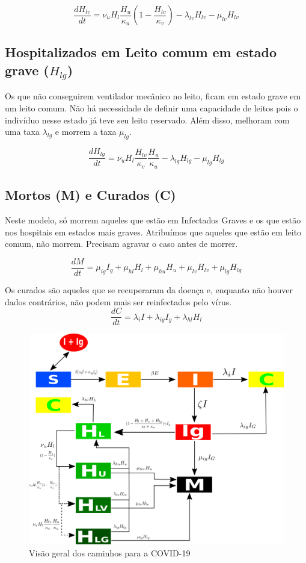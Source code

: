 \documentclass[12pt,letterpaper]{article}
\begin{document}
\begin{equation}
	\frac{dH_{lv}}{dt}=\nu_u H_l\frac{H_u}{\kappa_{u}}(1-\frac{H_{lv}}{\kappa_{v}})  - \lambda_{lv}H_{lv}-\mu_{lv}H_{lv}
\end{equation}
\subsection{Hospitalizados em Leito comum em estado grave ($H_{lg}$)}
Os que não conseguirem ventilador mecânico no leito, ficam em estado grave em um leito comum. Não há necessidade de definir uma capacidade de leitos pois o indivíduo nesse estado já teve seu leito reservado. Além disso, melhoram com uma taxa $\lambda_{lg}$ e morrem a taxa $\mu_{lg}$.

\begin{equation}
	\frac{dH_{lg}}{dt}=\nu_u H_l\frac{H_{lv}}{\kappa_{v}}\frac{H_u}{\kappa_{u}} -\lambda_{lg}H_{lg}-\mu_{lg}H_{lg} 
\end{equation}

\subsection{Mortos (M) e Curados (C)}
Neste modelo, só morrem aqueles que estão em Infectados Graves e os que estão nos hospitais em estados mais graves. Atribuímos que aqueles que estão em leito comum, não morrem. Precisam agravar o caso antes de morrer.

\begin{equation}
	\frac{dM}{dt}=\mu_{ig}I_{g} +\mu_{hl}H_l + \mu_{hu}H_u +\mu_{lv} H_{lv}+\mu_{lg} H_{lg}
\end{equation}

Os curados são aqueles que se recuperaram da doença e, enquanto não houver dados contrários, não podem mais ser reinfectados pelo vírus.
\begin{equation}
	\frac{dC}{dt}=\lambda_i I + \lambda_{ig} I_g +\lambda_{hl}H_l 
\end{equation}

\begin{figure}[!h]
	\centering
	\includegraphics[scale=0.4]{covid}
	\caption{Visão geral dos caminhos para a COVID-19}
	\label{fig:universe}
\end{figure}
\end{document}
